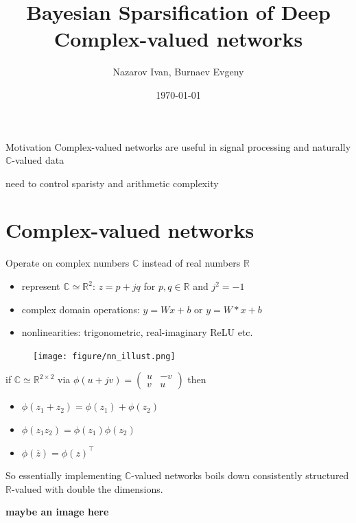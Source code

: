 \documentclass{beamer}
\title[Exam]{Bayesian Sparsification of Deep Complex-valued networks}
\author[Nazarov I., Burnaev E.]{Nazarov Ivan, Burnaev Evgeny}
\date{\today}
\institute[Skoltech]{Skolkovo Institute of Science and Technology}
\newcommand{\real}{\mathbb{R}}
\newcommand{\cplx}{\mathbb{C}}
\newcommand{\conj}[1]{\overline{#1}}
\begin{document}
\begin{frame}
  \titlepage
\end{frame}

\begin{frame}[c]{Motivation}
  Complex-valued networks are useful in signal processing and naturally $\cplx$-valued data

  need to control sparisty and arithmetic complexity
\end{frame}

\section{Complex-valued networks} %
\label{sec:complex_valued_networks}

\begin{frame}[c]{\insertsection}
  \bigskip
  Operate on complex numbers $\cplx$ instead of real numbers $\real$
  \begin{itemize}
    \item represent $\cplx \simeq \real^2$: $
      z = p + j q
    $ for $p, q \in \real$ and $j^2 = -1$
    \item complex domain operations: $y = W x + b$ or $y = W \ast x + b$
    \item nonlinearities: trigonometric, real-imaginary ReLU etc.
  \end{itemize}

  \begin{figure}
    \centering
    \texttt{[image: figure/nn\_illust.png]}
  \end{figure}

  if $\cplx \simeq \real^{2\times 2}$ via $
    \phi(u + jv)
      = \begin{pmatrix}
        u & -v\\
        v & u
      \end{pmatrix}
  $ then
  \begin{itemize}
    \item $\phi(z_1 + z_2) = \phi(z_1) + \phi(z_2)$
    \item $\phi(z_1 z_2) = \phi(z_1) \phi(z_2)$
    \item $\phi(\conj{z}) = \phi(z)^\top$
  \end{itemize}

  So essentially implementing $\cplx$-valued networks boils down consistently
  structured $\real$-valued with double the dimensions.

  \textbf{maybe an image here}
\end{frame}
\end{document}
